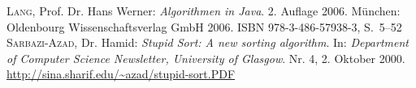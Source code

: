 \documentclass[german]{pfBook}
\begin{document}
	\begin{thebibliography}{99}
			\textsc{Lang}, Prof. Dr. Hans Werner: \emph{Algorithmen in Java}. 2. Auflage 2006. München: Oldenbourg Wissenschaftsverlag GmbH 2006. ISBN 978-3-486-57938-3, S.~5--52
			\textsc{Sarbazi-Azad}, Dr. Hamid: \emph{Stupid Sort: A new sorting algorithm}. In: \emph{Department of Computer Science Newsletter, University of Glasgow}. Nr. 4, 2. Oktober 2000. \href{http://sina.sharif.edu/~azad/stupid-sort.PDF}{http://sina.sharif.edu/\~{}azad/stupid-sort.PDF}
	\end{thebibliography}
	
	\makelistoffigures
	\makelistoflistings
\end{document}
